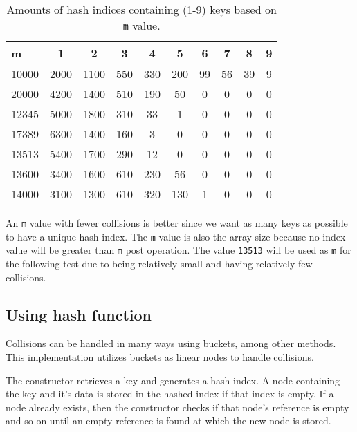 \documentclass[a4paper,11pt]{article}
\begin{document}
\begin{table}[h]
  \begin{center}
  \begin{tabular}{l|c|c|c|c|c|c|c|c|c}
  \textbf{m} & \textbf{1} & \textbf{2} & \textbf{3} & \textbf{4} & 
  \textbf{5} & \textbf{6} & \textbf{7} & \textbf{8} & \textbf{9} \\
  \hline
    10000 & 2000 & 1100 & 550 & 330 & 200 & 99 & 56 & 39 & 9 \\
    20000 & 4200 & 1400 & 510 & 190 & 50  & 0  & 0  & 0  & 0 \\
    12345 & 5000 & 1800 & 310 & 33  & 1   & 0  & 0  & 0  & 0 \\
    17389 & 6300 & 1400 & 160 & 3   & 0   & 0  & 0  & 0  & 0 \\
    13513 & 5400 & 1700 & 290 & 12  & 0   & 0  & 0  & 0  & 0 \\
    13600 & 3400 & 1600 & 610 & 230 & 56  & 0  & 0  & 0  & 0 \\
    14000 & 3100 & 1300 & 610 & 320 & 130 & 1  & 0  & 0  & 0 \\
  \end{tabular}
  \caption{Amounts of hash indices containing (1-9) keys based on {\tt m} value.}
  \label{tab:table3}
  \end{center}
\end{table}

An {\tt m} value with fewer collisions is better since we want as many 
keys as possible to have a unique hash index. The {\tt m} value is also 
the array size because no index value will be greater than {\tt m} post
operation. The value {\tt 13513} will be used as {\tt m} for the following 
test due to being relatively small and having relatively few collisions.

\subsection*{Using hash function}

Collisions can be handled in many ways using buckets, among other 
methods. This implementation utilizes buckets as linear nodes to handle
collisions. 

The constructor retrieves a key and generates a hash index. A node 
containing the key and it's data is stored in the hashed index if that 
index is empty. If a node already exists, then the constructor checks if 
that node's reference is empty and so on until an empty reference is 
found at which the new node is stored.
\end{document}
